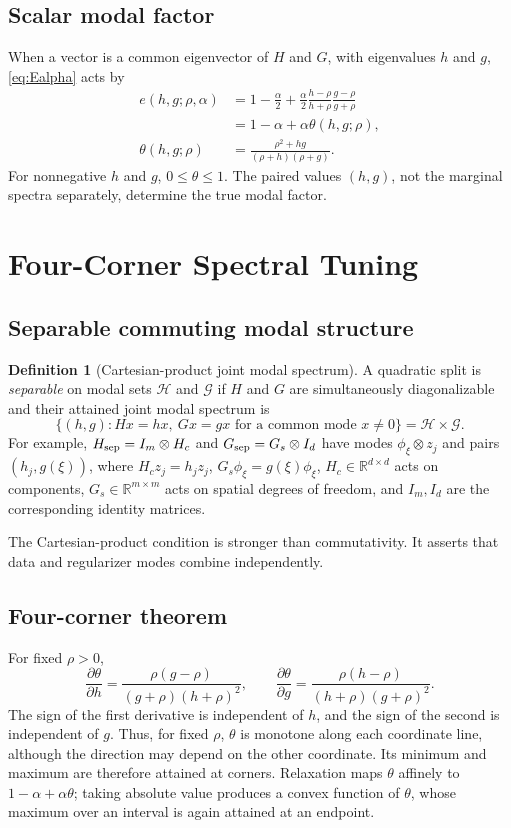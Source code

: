 \documentclass[11pt]{article}
\theoremstyle{definition}
\newtheorem{definition}[theorem]{Definition}
\newcommand{\R}{\mathbb{R}}
\begin{document}
\subsection{Scalar modal factor}
When a vector is a common eigenvector of $H$ and $G$, with eigenvalues $h$ and
$g$, \eqref{eq:Ealpha} acts by
\begin{align}
e(h,g;\rho,\alpha)
&=1-\frac{\alpha}{2}
+\frac{\alpha}{2}
\frac{h-\rho}{h+\rho}\frac{g-\rho}{g+\rho}\label{eq:modal}\\
&=1-\alpha+\alpha\theta(h,g;\rho),\nonumber\\
\theta(h,g;\rho)&=
\frac{\rho^2+hg}{(\rho+h)(\rho+g)}.\label{eq:theta}
\end{align}
For nonnegative $h$ and $g$, $0\le\theta\le1$. The paired values $(h,g)$,
not the marginal spectra separately, determine the true modal factor.

\section{Four-Corner Spectral Tuning}\label{sec:fourcorner}
\subsection{Separable commuting modal structure}
\begin{definition}[Cartesian-product joint modal spectrum]\label{def:cartesian}
A quadratic split is \emph{separable} on modal sets
$\mathcal H$ and $\mathcal G$ if $H$ and $G$ are simultaneously diagonalizable
and their attained joint modal spectrum is
\[
\{(h,g): Hx=hx,\ Gx=gx\text{ for a common mode }x\ne0\}
=\mathcal H\times\mathcal G.
\]
For example,
$H_{\rm sep}=I_m\otimes H_c$ and
$G_{\rm sep}=G_s\otimes I_d$ have modes
$\phi_\xi\otimes z_j$ and pairs $(h_j,g(\xi))$, where
$H_cz_j=h_jz_j$, $G_s\phi_\xi=g(\xi)\phi_\xi$,
$H_c\in\R^{d\times d}$ acts on components,
$G_s\in\R^{m\times m}$ acts on spatial degrees of freedom, and $I_m,I_d$ are
the corresponding identity matrices.
\end{definition}
The Cartesian-product condition is stronger than commutativity. It asserts
that data and regularizer modes combine independently.

\subsection{Four-corner theorem}
For fixed $\rho>0$,
\begin{equation}
\frac{\partial\theta}{\partial h}
=\frac{\rho(g-\rho)}{(g+\rho)(h+\rho)^2},\qquad
\frac{\partial\theta}{\partial g}
=\frac{\rho(h-\rho)}{(h+\rho)(g+\rho)^2}.
\label{eq:theta_derivatives}
\end{equation}
The sign of the first derivative is independent of $h$, and the sign of the
second is independent of $g$. Thus, for fixed $\rho$, $\theta$ is monotone
along each coordinate line, although the direction may depend on the other
coordinate. Its minimum and maximum are therefore attained at corners.
Relaxation maps $\theta$ affinely to
$1-\alpha+\alpha\theta$; taking absolute value produces a convex function of
$\theta$, whose maximum over an interval is again attained at an endpoint.
\end{document}

